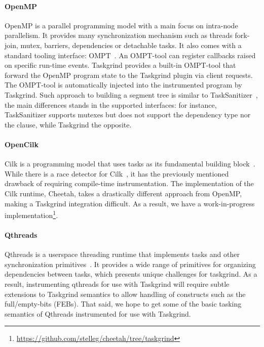 \paragraph{OpenMP}
OpenMP is a parallel programming model with a main focus on intra-node parallelism.
It provides many synchronization mechanism such as threads fork-join, mutex, barriers, dependencies or detachable tasks.
It also comes with a standard tooling interface: OMPT~\cite{ompt}.
An OMPT-tool can register callbacks raised on specific run-time events.
Taskgrind provides a built-in OMPT-tool that forward the OpenMP program state to the Taskgrind plugin via client requests.
The OMPT-tool is automatically injected into the instrumented program by Taskgrind.
Such approach to building a segment tree is similar to TaskSanitizer~\cite{Matar18}, the main differences stands in the supported interfaces: for instance, TaskSanitizer supports mutexes but does not support the  dependency type nor the  clause, while Taskgrind the opposite.

\paragraph{OpenCilk}
Cilk is a programming model that uses tasks as its fundamental building block~\cite{cilk}.
While there is a race detector for Cilk~\cite{opencilk}, it has the previously mentioned drawback of requiring compile-time instrumentation.
The implementation of the Cilk runtime, Cheetah, takes a drastically different approach from OpenMP, making a Taskgrind integration difficult.
As a result, we have a work-in-progress implementation\footnote{\url{https://github.com/stelleg/cheetah/tree/taskgrind}}.

\paragraph{Qthreads}
Qthreads is a userspace threading runtime that implements tasks and other synchronization primitives~\cite{qthreads}. It provides a wide range of primitives for organizing dependencies between tasks, which presents unique challenges for taskgrind. As a result, instrumenting qthreads for use with Taskgrind will require subtle extensions to Taskgrind semantics to allow handling of constructs such as the full/empty-bits (FEBs). That said, we hope to get some of the basic tasking semantics of Qthreads instrumented for use with Taskgrind. 



